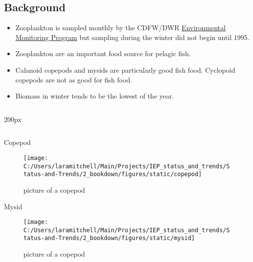 \documentclass[
]{book}
\providecommand{\tightlist}{%
  \setlength{\itemsep}{0pt}\setlength{\parskip}{0pt}}
\begin{document}
\begin{columns-nocenter}

\begin{column}{0.7\textwidth}
\begin{column}

\hypertarget{background-3}{%
\subsection{Background}\label{background-3}}

\begin{itemize}
\tightlist
\item
  Zooplankton is sampled monthly by the CDFW/DWR \href{https://emp.baydeltalive.com/wiki/12297}{Environmental Monitoring Program} but sampling during the winter did not begin until 1995.
\item
  Zooplankton are an important food source for pelagic fish.
\item
  Calanoid copepods and mysids are particularly good fish food. Cyclopoid copepods are not as good for fish food.
\item
  Biomass in winter tends to be the lowest of the year.
\end{itemize}

\end{column}
\end{column}

\begin{column}{200px\textwidth}
\begin{column}

Copepod

\begin{figure}

{\centering \texttt{[image: C:/Users/laramitchell/Main/Projects/IEP\_status\_and\_trends/Status-and-Trends/2\_bookdown/figures/static/copepod]} 

}

\caption{picture of a copepod}\label{fig:unnamed-chunk-162}
\end{figure}

Mysid

\begin{figure}

{\centering \texttt{[image: C:/Users/laramitchell/Main/Projects/IEP\_status\_and\_trends/Status-and-Trends/2\_bookdown/figures/static/mysid]} 

}

\caption{picture of a copepod}\label{fig:unnamed-chunk-163}
\end{figure}

\end{column}
\end{column}

\end{columns-nocenter}
\end{document}
